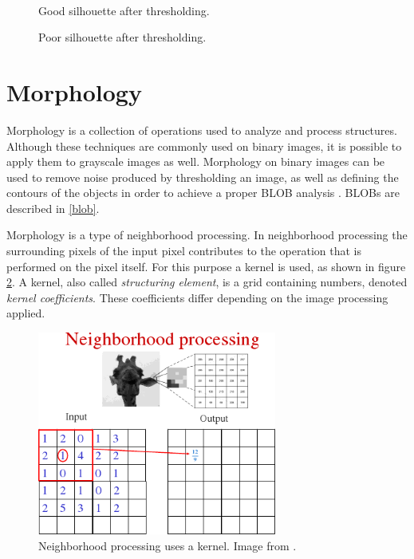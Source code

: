 \begin{figure}[htbp]
\begin{minipage}[b]{0.45\textwidth}
\end{minipage} \\ %
\begin{minipage}[t]{0.45\textwidth}
\caption{Good silhouette after thresholding.} %
\label{fig:SimpleThresholdAfter}
\end{minipage} \hfill
\begin{minipage}[t]{0.45\textwidth}
\caption{Poor silhouette after thresholding.} %
\label{fig:ComplicatedThresholdAfter}
\end{minipage}
\end{figure}

\section{Morphology}
Morphology is a collection of operations used to analyze and process structures. Although these techniques are commonly used on binary images, it is possible to apply them to grayscale images as well. Morphology on binary images can be used to remove noise produced by thresholding an image, as well as defining the contours of the objects in order to achieve a proper BLOB analysis \citep{ip_book}. BLOBs are described in \ref{blob}.

Morphology is a type of neighborhood processing. In neighborhood processing the surrounding pixels of the input pixel contributes to the operation that is performed on the pixel itself. For this purpose a kernel is used, as shown in figure \ref{fig:kernel}. A kernel, also called \textit{structuring element}, is a grid containing numbers, denoted \textit{kernel coefficients}. These coefficients differ depending on the image processing applied.

\begin{figure}[htbp]
\centering
\includegraphics[width=0.7\textwidth]{Pictures/Theory/kernel}
\caption{Neighborhood processing uses a kernel. Image from \citep{ip_book}.}
\label{fig:kernel}
\end{figure}

